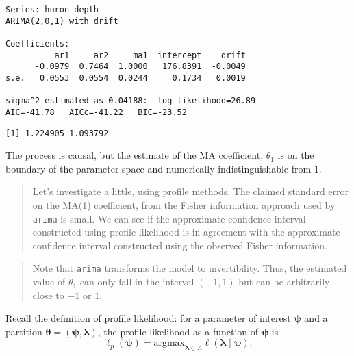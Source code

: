 \documentclass[]{book}
\newenvironment{Shaded}{\begin{snugshade}}{\end{snugshade}}
\newcommand{\CommentTok}[1]{\textcolor[rgb]{0.56,0.35,0.01}{\textit{#1}}}
\newcommand{\DecValTok}[1]{\textcolor[rgb]{0.00,0.00,0.81}{#1}}
\newcommand{\KeywordTok}[1]{\textcolor[rgb]{0.13,0.29,0.53}{\textbf{#1}}}
\newcommand{\NormalTok}[1]{#1}
\newcommand{\OperatorTok}[1]{\textcolor[rgb]{0.81,0.36,0.00}{\textbf{#1}}}
\newcommand{\StringTok}[1]{\textcolor[rgb]{0.31,0.60,0.02}{#1}}
\begin{document}
\begin{verbatim}
Series: huron_depth 
ARIMA(2,0,1) with drift 

Coefficients:
          ar1     ar2     ma1  intercept    drift
      -0.0979  0.7464  1.0000   176.8391  -0.0049
s.e.   0.0553  0.0554  0.0244     0.1734   0.0019

sigma^2 estimated as 0.04188:  log likelihood=26.89
AIC=-41.78   AICc=-41.22   BIC=-23.52
\end{verbatim}

\begin{Shaded}
\end{Shaded}

\begin{verbatim}
[1] 1.224905 1.093792
\end{verbatim}

The process is causal, but the estimate of the MA coefficient, \(\theta_1\) is on the boundary of the parameter space and numerically indistinguishable from 1.

\begin{quote}
Let's investigate a little, using profile methods. The claimed standard error on the MA(1) coefficient, from the Fisher information approach used by \texttt{arima} is small. We can see if the approximate confidence interval constructed using profile likelihood is in agreement with the approximate confidence interval constructed using the observed Fisher information.
\end{quote}

\begin{quote}
Note that \texttt{arima} transforms the model to invertibility. Thus, the estimated value of \(\theta_1\) can only fall in the interval \((−1, 1)\) but can be arbitrarily close to \(−1\) or \(1\).
\end{quote}

Recall the definition of profile likelihood: for a parameter of interest \(\boldsymbol{\psi}\) and a partition \(\boldsymbol{\theta}=(\boldsymbol{\psi}, \boldsymbol{\lambda})\), the profile likelihood as a function of \(\boldsymbol{\psi}\) is
\[\ell_p(\boldsymbol{\psi}) = \mathrm{argmax}_{\boldsymbol{\lambda} \in \Lambda} \ell(\boldsymbol{\lambda} \mid \boldsymbol{\psi}).\]
\end{document}
